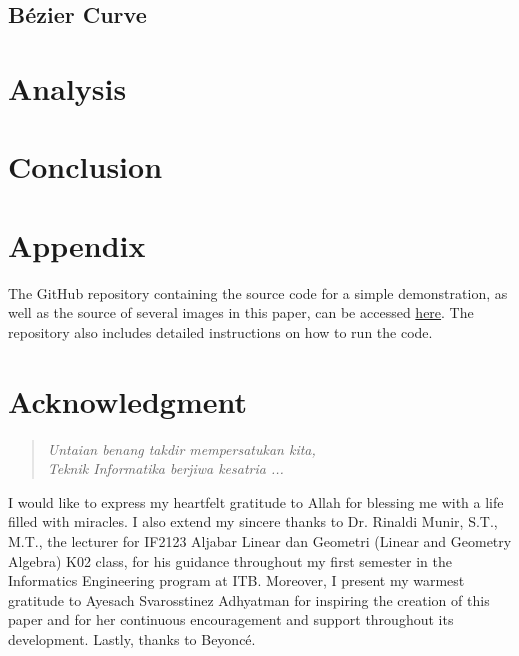 \documentclass[conference]{IEEEtran}
\begin{document}
\subsection{Bézier Curve} 



\section{Analysis}

\section{Conclusion}

\section{Appendix}
    The GitHub repository containing the source code for a simple demonstration, as well as the source of several images in this paper, can be accessed \href{https://github.com/nayakazna}{\color{blue} here}. The repository also includes detailed instructions on how to run the code.

\section{Acknowledgment}

\begin{quote}
    \textit{Untaian benang takdir mempersatukan kita, \\
    Teknik Informatika berjiwa kesatria ...}
\end{quote}

I would like to express my heartfelt gratitude to Allah for blessing me with a life filled with miracles. 
I also extend my sincere thanks to Dr. Rinaldi Munir, S.T., M.T., the lecturer for IF2123 Aljabar 
Linear dan Geometri (Linear and Geometry Algebra) K02 class, for his guidance throughout my first semester 
in the Informatics Engineering program at ITB. Moreover, I present my warmest gratitude to Ayesach Svarosstinez
Adhyatman for inspiring the creation of this paper and for her continuous encouragement and support throughout 
its development. Lastly, thanks to Beyoncé.
\end{document}
